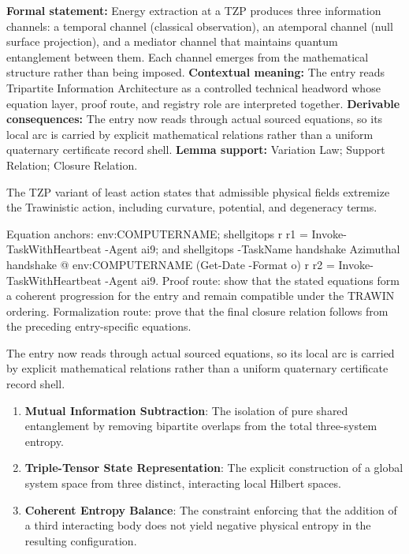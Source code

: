 \begingroup\footnotesize\setlength{\emergencystretch}{3em}\sloppy
\textbf{Formal statement:} Energy extraction at a TZP produces three information channels: a temporal channel (classical observation), an atemporal channel (null surface projection), and a mediator channel that maintains quantum entanglement between them. Each channel emerges from the mathematical structure rather than being imposed. \textbf{Contextual meaning:} The entry reads Tripartite Information Architecture as a controlled technical headword whose equation layer, proof route, and registry role are interpreted together. \textbf{Derivable consequences:} The entry now reads through actual sourced equations, so its local arc is carried by explicit mathematical relations rather than a uniform quaternary certificate record shell. \textbf{Lemma support:} Variation Law; Support Relation; Closure Relation.\par
\endgroup

The TZP variant of least action states that admissible physical fields extremize the Trawinistic action, including curvature, potential, and degeneracy terms.

Equation anchors: env:COMPUTERNAME; shellgitops r r1 = Invoke-TaskWithHeartbeat -Agent ai9; and shellgitops -TaskName handshake Azimuthal handshake @ env:COMPUTERNAME (Get-Date -Format o) r r2 = Invoke-TaskWithHeartbeat -Agent ai9. Proof route: show that the stated equations form a coherent progression for the entry and remain compatible under the TRAWIN ordering. Formalization route: prove that the final closure relation follows from the preceding entry-specific equations.

The entry now reads through actual sourced equations, so its local arc is carried by explicit mathematical relations rather than a uniform quaternary certificate record shell.
\endgroup

\begin{enumerate}[leftmargin=1.6em,itemsep=6pt,topsep=4pt]
\item \textbf{Mutual Information Subtraction}: The isolation of pure shared entanglement by removing bipartite overlaps from the total three-system entropy.
\item \textbf{Triple-Tensor State Representation}: The explicit construction of a global system space from three distinct, interacting local Hilbert spaces.
\item \textbf{Coherent Entropy Balance}: The constraint enforcing that the addition of a third interacting body does not yield negative physical entropy in the resulting configuration.
\end{enumerate}

